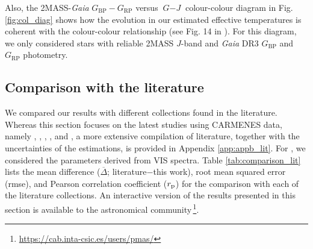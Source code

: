 Also, the 2MASS-\textit{Gaia} $\textit{G}_{\mathrm{BP}} - \textit{G}_{\mathrm{RP}}$ versus $\textit{G}-\textit{J}$ colour-colour diagram in Fig. \ref{fig:col_diag} shows how the evolution in our estimated effective temperatures is coherent with the colour-colour relationship (see Fig. 14 in \citealt{cifuentes2020}). For this diagram, we only considered stars with reliable 2MASS $J$-band and \textit{Gaia} DR3 $\textit{G}_{\mathrm{BP}}$ and $\textit{G}_{\mathrm{RP}}$ photometry.




\subsection{Comparison with the literature}
\label{acs_sec:lit_comp}

We compared our results with different collections found in the literature. Whereas this section focuses on the latest studies using CARMENES data, namely , , , , and , a more extensive compilation of literature, together with the uncertainties of the estimations, is provided in Appendix \ref{app:appb_lit}. For , we considered the parameters derived from VIS spectra. Table \ref{tab:comparison_lit} lists the mean difference ($\overline{\Delta}$; literature$-$this work), root mean squared error (rmse), and Pearson correlation coefficient ($r_{\rm p}$) for the comparison with each of the literature collections. An interactive version of the results presented in this section is available to the astronomical community\,\footnote{\url{https://cab.inta-csic.es/users/pmas/}}.


